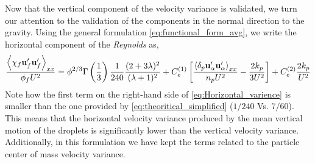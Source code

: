 Now that the vertical component of the velocity variance is validated, we turn our attention to the validation of the components in the normal direction to the gravity. 
Using the general formulation \ref{eq:functional_form_avg}, we write the horizontal component of the \textit{Reynolds} as, 
\begin{equation}
    \frac{\avg{\chi_f \textbf{u}_f'\textbf{u}_f'}_{xx}}{\phi_f U^2}
    = \phi^{2/3}\Gamma\left(\frac{1}{3}\right) \frac{1}{240}\frac{(2+3\lambda)^2 }{(\lambda+1)^2}
    + 
    C^{(1)}_e \left[
    \frac{\pavg{\textbf{u}_\alpha'\textbf{u}_\alpha'}_{xx}}{n_p U^2}
    - \frac{2k_p}{3U^2}  
    \right]
    + C^{(2)}_e
    \frac{2k_p}{U^2}  
    \label{eq:Horizontal_varience}
\end{equation}
Note how the first term on the right-hand side of \ref{eq:Horizontal_varience} is smaller than the one provided by \ref{eq:theoritical_simplified} ($1/240$ Vs. $7/60$). 
This means that the horizontal velocity variance produced by the mean vertical motion of the droplets is significantly lower than the vertical velocity variance. 
Additionally, in this formulation we have kept the terms related to the particle center of mass velocity variance. 


